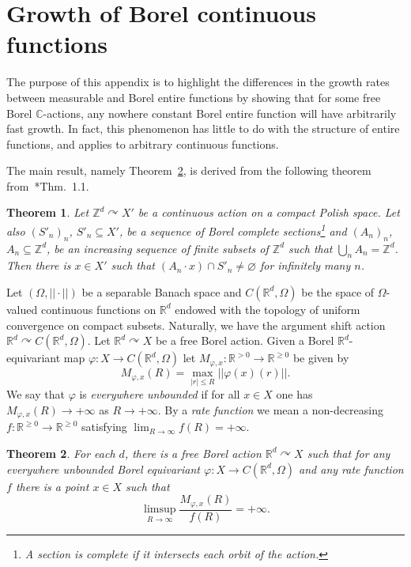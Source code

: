 \documentclass[12pt]{paper}
\numberwithin{equation}{section}
\theoremstyle{plain}
\newtheorem{theorem}{Theorem}[section]
\theoremstyle{definition}
\newcommand{\C}{\mathbb{C}}
\newcommand{\R}{\mathbb{R}}
\newcommand{\Rd}{\mathbb{R}^{d}}
\newcommand{\Zd}{\mathbb{Z}^{d}}
\newcommand{\acts}{\curvearrowright}
\newcommand{\norm}[1]{||#1||}
\renewcommand{\phi}{\varphi}
\begin{document}
\section{Growth of Borel continuous functions}
\label{sec:growth-introduction}

The purpose of this appendix is to highlight the differences in the growth rates between measurable
and Borel entire functions by showing that for some free Borel \(\C\)-actions, any nowhere constant
Borel entire function will have arbitrarily fast growth.  In fact, this phenomenon has little to do
with the structure of entire functions, and applies to arbitrary continuous functions.

The main result, namely Theorem~\ref{thm:growth-rate-limsup}, is derived from the following theorem
from~\cite{gaoForcingConstructionsCountable2022}*{Thm.~1.1}.
\begin{theorem}
  \label{thm:gjks}
  Let \(\Zd \acts X'\) be a continuous action on a compact Polish space.  Let also \((S'_{n})_{n}\),
  \(S'_{n} \subseteq X'\), be a sequence of Borel complete sections\footnote{A section is complete
    if it intersects each orbit of the action.} and \((A_{n})_{n}\), \(A_{n} \subseteq \Zd\), be an
  increasing sequence of finite subsets of \(\Zd\) such that \(\bigcup_{n}A_{n} = \Zd\).  Then there
  is \(x \in X'\) such that \((A_{n} \cdot x) \cap S'_{n} \ne \varnothing\) for infinitely many
  \(n\).
\end{theorem}

Let \((\Omega, \norm{\cdot})\) be a separable Banach space and \(C(\Rd, \Omega)\) be the space of
\(\Omega\)-valued continuous functions on \(\Rd\) endowed with the topology of uniform convergence
on compact subsets.  Naturally, we have the argument shift action \(\Rd\acts C(\Rd, \Omega)\).  Let
\(\Rd \acts X\) be a free Borel action.  Given a Borel \(\Rd\)-equivariant map
\(\phi : X \to C(\Rd, \Omega)\) let \(M_{\phi, x} : \R^{> 0} \to \R^{\ge 0}\) be given by
\[M_{\phi, x}(R) = \max_{|r|\le R} \norm{\phi(x)(r)}.\]
We say that \(\phi\) is \emph{everywhere unbounded} if for all \(x \in X\) one has
\(M_{\phi,x}(R) \to +\infty\) as \(R \to +\infty\).  By a \emph{rate function} we mean a
non-decreasing \(f : \R^{\ge 0} \to \R^{\ge 0}\) satisfying \(\lim_{R \to \infty}f(R) = +\infty\).

\begin{theorem}
  \label{thm:growth-rate-limsup}
  For each \(d\), there is a free Borel action \(\Rd \acts X\) such that for any everywhere
  unbounded Borel equivariant \(\phi : X \to C(\Rd, \Omega)\) and any rate function \(f\) there is a
  point \(x \in X\) such that
  \[\limsup_{R \to \infty} \dfrac{M_{\phi, x}(R)}{f(R)} = +\infty.\]
\end{theorem}
\end{document}

